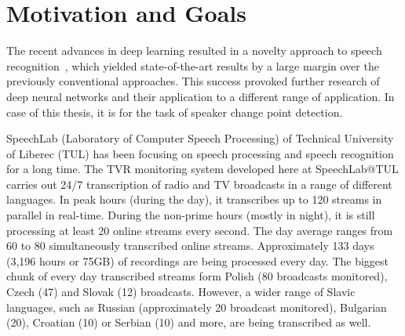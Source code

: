 \documentclass[FM,noheader,EN,bwtitles]{tulthesis}
\begin{document}
\chapter{Motivation and Goals}
\label{ch:goalsAndMotivation}

The recent advances in deep learning resulted in a novelty approach to speech recognition~\parencite{DBLP:journals/taslp/DahlYDA12}, which yielded state-of-the-art results by a large margin over the previously conventional approaches.
This success provoked further research of deep neural networks and their application to a different range of application.
In case of this thesis, it is for the task of speaker change point detection.

SpeechLab (Laboratory of Computer Speech Processing) of Technical University of Liberec (TUL) has been focusing on speech processing and speech recognition for a long time.
The TVR monitoring system developed here at SpeechLab@TUL carries out 24/7 transcription of radio and TV broadcasts in a range of different languages.
In peak hours (during the day), it transcribes up to 120 streams in parallel in real-time.
During the non-prime hours (mostly in night), it is still processing at least 20 online streams every second.
The day average ranges from 60 to 80 simultaneously transcribed online streams.
Approximately 133 days (3,196 hours or 75GB) of recordings are being processed every day.
The biggest chunk of every day transcribed streams form Polish (80 broadcasts monitored), Czech (47) and Slovak (12) broadcasts.
However, a wider range of Slavic languages, such as Russian (approximately 20 broadcast monitored), Bulgarian (20), Croatian (10) or Serbian (10) and more, are being transcribed as well.
\end{document}
